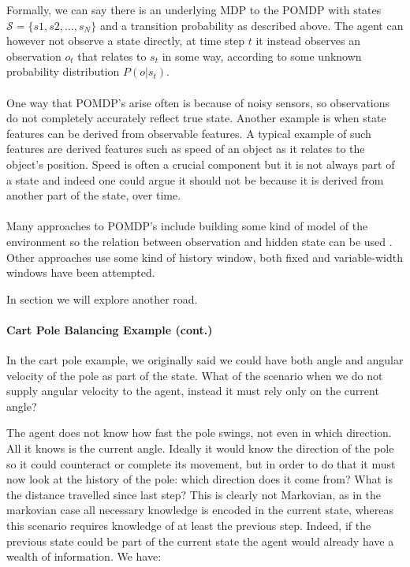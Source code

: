 Formally, we can say there is an underlying MDP to the POMDP
with states $\mathcal{S} = \{s1, s2,\dots,s_N\}$
and a transition probability as described above.
The agent can however not observe a state directly,
at time step $t$ it instead observes an observation $o_t$
that relates to $s_t$ in some way,
according to some unknown probability distribution $P(o|s_t)$.

\paragraph{}
One way that POMDP's arise often is because of noisy sensors,
so observations do not completely accurately reflect true state. 
Another example is when state features can be derived
from observable features.
A typical example of such features are derived features
such as speed of an object as it relates to the object's position.
Speed is often a crucial component but it is not always
part of a state and indeed one could argue it should not be
because it is derived from another part of the state, over time.

\paragraph{}
Many approaches to POMDP's
include building some kind of model of the environment
so the relation between observation and hidden state can be used
\parencite{Cassandra1994}.
Other approaches use some kind of history window,
both fixed
\parencite{mccallum1995instance}
and variable-width windows
\parencite{ring1994continual}
have been attempted.

In section %
we will explore another road.

\paragraph{Cart Pole Balancing Example (cont.)}
In the cart pole example, we originally said we could have both angle
and angular velocity of the pole as part of the state.
What of the scenario when we do not supply angular velocity to the agent,
instead it must rely only on the current angle?

The agent does not know how fast the pole swings,
not even in which direction.
All it knows is the current angle.
Ideally it would know the direction of the pole
so it could counteract or complete its movement,
but in order to do that it must now look at the history
of the pole: which direction does it come from?
What is the distance travelled since last step?
This is clearly not Markovian,
as in the markovian case all necessary knowledge
is encoded in the current state,
whereas this scenario requires knowledge of at least the previous step.
Indeed, if the previous state could be part of the current state
the agent would already have a wealth of information.
We have:

